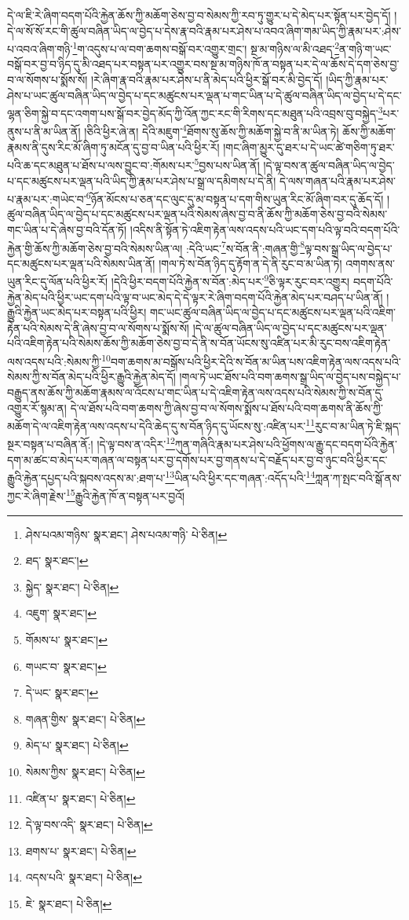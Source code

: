 དེ་ལ་ཇི་རེ་ཞིག་བདག་པོའི་རྐྱེན་ཆོས་ཀྱི་མཆོག་ཅེས་བྱ་བ་སེམས་ཀྱི་རབ་ཏུ་གྱུར་པ་དེ་མེད་པར་སྟོན་པར་བྱེད་དོ། །དེ་ལ་སོ་སོ་རང་གི་ཚུལ་བཞིན་ཡིད་ལ་བྱེད་པ་དེས་རྣ་བའི་རྣམ་པར་ཤེས་པ་འབའ་ཞིག་གམ་ཡིད་ཀྱི་རྣམ་པར་:ཤེས་པ་འབའ་ཞིག་གཉི་\footnote{ཤེས་པའམ་གཉིས་  སྣར་ཐང་། ཤེས་པའམ་གཉི་  པེ་ཅིན། }ག་འདུས་པ་ལ་བག་ཆགས་བསྒོ་བར་འགྱུར་གྲང་། སྔ་མ་གཉིས་ལ་མི་འཐད་\footnote{ཐད་  སྣར་ཐང་། }ན་གཉི་ག་ཡང་བསྒོ་བར་བྱ་བ་ཉིད་དུ་མི་འཐད་པར་བསྟན་པར་འགྱུར་བས་སྔ་མ་གཉིས་ཁོ་ན་བསྟན་པར་དེ་ལ་ཆོས་དེ་དག་ཅེས་བྱ་བ་ལ་སོགས་པ་སྨོས་སོ། །རེ་ཞིག་རྣ་བའི་རྣམ་པར་ཤེས་པ་ནི་མེད་པའི་ཕྱིར་སྒོ་བར་མི་བྱེད་དོ། །ཡིད་ཀྱི་རྣམ་པར་ཤེས་པ་ཡང་ཚུལ་བཞིན་ཡིད་ལ་བྱེད་པ་དང་མཚུངས་པར་ལྡན་པ་གང་ཡིན་པ་དེ་ཚུལ་བཞིན་ཡིད་ལ་བྱེད་པ་དེ་དང་ལྷན་ཅིག་སྐྱེ་བ་དང་འགག་པས་སྒོ་བར་བྱེད་མོད་ཀྱི་འོན་ཀྱང་རང་གི་རིགས་དང་མཐུན་པའི་འབྲས་བུ་བསྐྱེད་\footnote{སྐྱེད་  སྣར་ཐང་།  པེ་ཅིན། }པར་ནུས་པ་ནི་མ་ཡིན་ནོ། །ཅིའི་ཕྱིར་ཞེ་ན། དེའི་མཇུག་\footnote{འཇུག་  སྣར་ཐང་། }ཐོགས་སུ་ཆོས་ཀྱི་མཆོག་སྐྱེ་བ་ནི་མ་ཡིན་ཏེ། ཆོས་ཀྱི་མཆོག་རྣམས་ནི་དུས་རིང་མོ་ཞིག་ཏུ་མངོན་དུ་བྱ་བ་ཡིན་པའི་ཕྱིར་རོ། །གང་ཞིག་མྱུར་དུ་ཐར་པ་དེ་ཡང་ཚེ་གཅིག་ཏུ་ཐར་པའི་ཆ་དང་མཐུན་པ་ཐོས་པ་ལས་བྱུང་བ་:གོམས་པར་\footnote{གོམས་པ་  སྣར་ཐང་། }བྱས་པས་ཡིན་ནོ། །དེ་ལྟ་བས་ན་ཚུལ་བཞིན་ཡིད་ལ་བྱེད་པ་དང་མཚུངས་པར་ལྡན་པའི་ཡིད་ཀྱི་རྣམ་པར་ཤེས་པ་སྒྲ་ལ་དམིགས་པ་དེ་ནི། དེ་ལས་གཞན་པའི་རྣམ་པར་ཤེས་པ་རྣམ་པར་:གཡེང་བ་\footnote{གཡང་བ་  སྣར་ཐང་། }ཉོན་མོངས་པ་ཅན་དང་ལུང་དུ་མ་བསྟན་པ་དག་གིས་ཡུན་རིང་མོ་ཞིག་བར་དུ་ཆོད་དོ། །ཚུལ་བཞིན་ཡིད་ལ་བྱེད་པ་དང་མཚུངས་པར་ལྡན་པའི་སེམས་ཞེས་བྱ་བ་ནི་ཆོས་ཀྱི་མཆོག་ཅེས་བྱ་བའི་སེམས་གང་ཡིན་པ་དེ་ཞེས་བྱ་བའི་དོན་ཏོ། །འདིས་ནི་སྟོན་ཏེ་འཇིག་རྟེན་ལས་འདས་པའི་ཡང་དག་པའི་ལྟ་བའི་བདག་པོའི་རྐྱེན་གྱི་ཆོས་ཀྱི་མཆོག་ཅེས་བྱ་བའི་སེམས་ཡིན་ལ། :དེའི་ཡང་\footnote{དེ་ཡང་  སྣར་ཐང་། }ས་བོན་ནི་:གཞན་གྱི་\footnote{གཞན་གྱིས་  སྣར་ཐང་།  པེ་ཅིན། }ལྟ་བས་སྒྲ་ཡིད་ལ་བྱེད་པ་དང་མཚུངས་པར་ལྡན་པའི་སེམས་ཡིན་ནོ། །གལ་ཏེ་ས་བོན་ཉིད་དུ་རྟོག་ན་དེ་ནི་རུང་བ་མ་ཡིན་ཏེ། འགགས་ནས་ཡུན་རིང་དུ་ལོན་པའི་ཕྱིར་རོ། །དེའི་ཕྱིར་བདག་པོའི་རྐྱེན་ས་བོན་:མེད་པར་\footnote{མེད་པ་  སྣར་ཐང་།  པེ་ཅིན། }ཅི་ལྟར་རུང་བར་འགྱུར། བདག་པོའི་རྐྱེན་མེད་པའི་ཕྱིར་ཡང་དག་པའི་ལྟ་བ་ཡང་མེད་དེ་དེ་ལྟར་རེ་ཞིག་བདག་པོའི་རྐྱེན་མེད་པར་བཤད་པ་ཡིན་ནོ། །རྒྱུའི་རྐྱེན་ཡང་མེད་པར་བསྟན་པའི་ཕྱིར། གང་ཡང་ཚུལ་བཞིན་ཡིད་ལ་བྱེད་པ་དང་མཚུངས་པར་ལྡན་པའི་འཇིག་རྟེན་པའི་སེམས་དེ་ནི་ཞེས་བྱ་བ་ལ་སོགས་པ་སྨོས་སོ། །དེ་ལ་ཚུལ་བཞིན་ཡིད་ལ་བྱེད་པ་དང་མཚུངས་པར་ལྡན་པའི་འཇིག་རྟེན་པའི་སེམས་ཆོས་ཀྱི་མཆོག་ཅེས་བྱ་བ་དེ་ནི་ས་བོན་ཡོངས་སུ་འཛིན་པར་མི་རུང་བས་འཇིག་རྟེན་ལས་འདས་པའི་:སེམས་ཀྱི་\footnote{སེམས་ཀྱིས་  སྣར་ཐང་།  པེ་ཅིན། }བག་ཆགས་མ་བསྒོས་པའི་ཕྱིར་དེའི་ས་བོན་མ་ཡིན་པས་འཇིག་རྟེན་ལས་འདས་པའི་སེམས་ཀྱི་ས་བོན་མེད་པའི་ཕྱིར་རྒྱུའི་རྐྱེན་མེད་དོ། །གལ་ཏེ་ཡང་ཐོས་པའི་བག་ཆགས་སྒྲ་ཡིད་ལ་བྱེད་པས་བསྐྱེད་པ་བརྒྱུད་ནས་ཆོས་ཀྱི་མཆོག་རྣམས་ལ་འོངས་པ་གང་ཡིན་པ་དེ་འཇིག་རྟེན་ལས་འདས་པའི་སེམས་ཀྱི་ས་བོན་དུ་འགྱུར་རོ་སྙམ་ན། དེ་ལ་ཐོས་པའི་བག་ཆགས་ཀྱི་ཞེས་བྱ་བ་ལ་སོགས་སྨོས་པ་ཐོས་པའི་བག་ཆགས་ནི་ཆོས་ཀྱི་མཆོག་དེ་ལ་འཇིག་རྟེན་ལས་འདས་པ་དེའི་ཆེད་དུ་ས་བོན་ཉིད་དུ་ཡོངས་སུ་:འཛིན་པར་\footnote{འཛིན་པ་  སྣར་ཐང་།  པེ་ཅིན། }རུང་བ་མ་ཡིན་ཏེ་ཇི་སྐད་སྔར་བསྟན་པ་བཞིན་ནོ:། །དེ་ལྟ་བས་ན་འདིར་\footnote{དེ་ལྟ་བས་འདི་  སྣར་ཐང་།  པེ་ཅིན། }ཀུན་གཞིའི་རྣམ་པར་ཤེས་པའི་ཕྱོགས་ལ་རྒྱུ་དང་བདག་པོའི་རྐྱེན་དག་མ་ཚང་བ་མེད་པར་གཞན་ལ་བསྟན་པར་བྱ་དགོས་པར་བྱ་གནས་པ་དེ་བརྗོད་པར་བྱ་བ་ཉུང་བའི་ཕྱིར་དང་རྒྱུའི་རྐྱེན་དཔྱད་པའི་སྐབས་འདས་མ་:ཐག་པ་\footnote{ཐགས་པ་  སྣར་ཐང་།  པེ་ཅིན། }ཡིན་པའི་ཕྱིར་དང་གཞན་:འདོད་པའི་\footnote{འདས་པའི་  སྣར་ཐང་།  པེ་ཅིན། }ཀླན་ཀ་སྤང་བའི་སྒོ་ནས་ཀྱང་རེ་ཞིག་རྗེས་\footnote{ཇེ་  སྣར་ཐང་།  པེ་ཅིན། }རྒྱུའི་རྐྱེན་ཁོ་ན་བསྟན་པར་བྱའོ། 